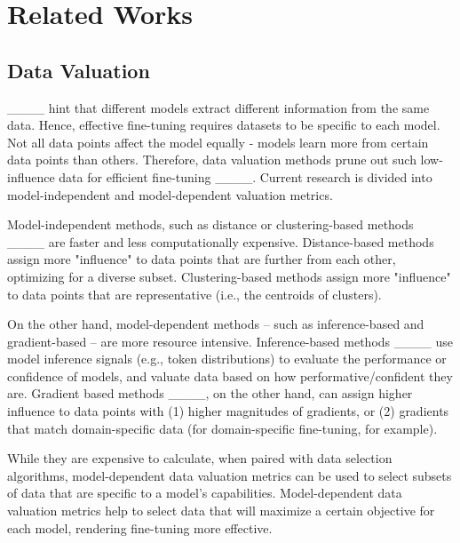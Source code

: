\section{Related Works}
\label{sec: related works}
\subsection{Data Valuation}
\label{sec: data valuation}
____ hint that different models extract different information from the same data. Hence, effective fine-tuning requires datasets to be specific to each model. Not all data points affect the model equally - models learn more from certain data points than others. Therefore, data valuation methods prune out such low-influence data for efficient fine-tuning ____. Current research is divided into model-independent and model-dependent valuation metrics. 

Model-independent methods, such as distance or clustering-based methods ____ are faster and less computationally expensive. Distance-based methods assign more "influence" to data points that are further from each other, optimizing for a diverse subset. Clustering-based methods assign more "influence" to data points that are representative (i.e., the centroids of clusters). 

On the other hand, model-dependent methods -- such as inference-based and gradient-based -- are more resource intensive. Inference-based methods ____ use model inference signals (e.g., token distributions) to evaluate the performance or confidence of models, and valuate data based on how performative/confident they are. Gradient based methods ____, on the other hand, can assign higher influence to data points with (1) higher magnitudes of gradients, or (2) gradients that match domain-specific data (for domain-specific fine-tuning, for example).

While they are expensive to calculate, when paired with data selection algorithms, model-dependent data valuation metrics can be used to select subsets of data that are specific to a model's capabilities. Model-dependent data valuation metrics help to select data that will maximize a certain objective for each model, rendering fine-tuning more effective. %


